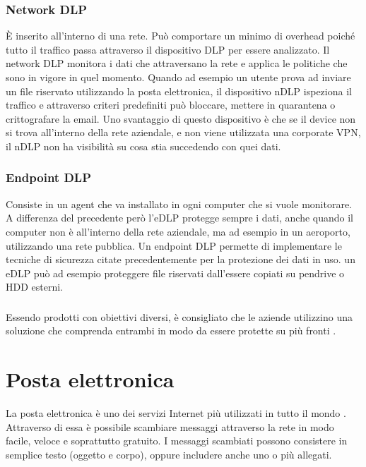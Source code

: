    \subsubsection{Network DLP}
            È inserito all'interno di una rete. Può comportare un minimo di overhead poiché tutto il traffico
            passa attraverso il dispositivo DLP per essere analizzato.
            Il network DLP monitora i dati che attraversano la rete e applica le politiche che sono in vigore
            in quel momento. Quando ad esempio un utente prova ad inviare un file riservato utilizzando la posta
            elettronica, il  dispositivo nDLP ispeziona il traffico e attraverso criteri predefiniti 
            può bloccare, mettere in quarantena o crittografare la email.
            Uno svantaggio di questo dispositivo è che se il device non si trova all'interno della rete aziendale,
            e non viene utilizzata una corporate VPN, il nDLP non ha visibilità su cosa stia succedendo con quei 
            dati.

    \subsubsection{Endpoint DLP}
            Consiste in un agent che va installato in ogni computer che si vuole monitorare. A differenza del precedente 
            però l'eDLP protegge sempre i dati, anche quando il computer non è all'interno della rete aziendale, ma ad esempio in un 
            aeroporto, utilizzando una rete pubblica. Un endpoint DLP permette di implementare le tecniche di sicurezza
            citate precedentemente per la protezione dei dati in uso. un eDLP può ad esempio proteggere file riservati
            dall'essere copiati su pendrive o HDD esterni.
    
    \subsubsection*{}     
    Essendo prodotti con obiettivi diversi, è consigliato che le aziende utilizzino una soluzione che comprenda entrambi
    in modo da essere protette su più fronti \cite{DLP5}.


\pagebreak
\section{Posta elettronica}
La posta elettronica è uno dei servizi Internet più utilizzati in tutto il mondo \cite{posta}. Attraverso di essa
è possibile scambiare messaggi attraverso la rete in modo facile, veloce e soprattutto gratuito. 
I messaggi scambiati possono consistere in semplice testo (oggetto e corpo), 
oppure includere anche uno o più allegati.

